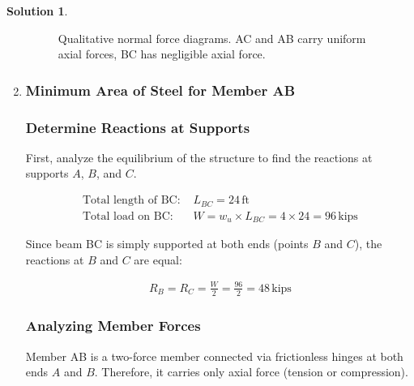 \documentclass[12pt]{article}
\theoremstyle{definition} %
\newtheorem{solution}{Solution}
\theoremstyle{plain} %
\begin{document}
\begin{solution}
\begin{enumerate}
\begin{figure}[h!]
        \caption{Qualitative normal force diagrams. AC and AB carry uniform axial forces, BC has negligible axial force.}
        \end{figure}
        
        
 
        
\hrulefill
\item \subsubsection*{Minimum Area of Steel for Member AB}

\subsubsection*{Determine Reactions at Supports}

First, analyze the equilibrium of the structure to find the reactions at supports \( A \), \( B \), and \( C \).


\begin{align}
\text{Total length of BC: } & L_{BC} = 24 \, \text{ft} \\
\text{Total load on BC: } & W = w_u \times L_{BC} = 4 \times 24 = 96 \, \text{kips}
\end{align}


Since beam BC is simply supported at both ends (points \( B \) and \( C \)), the reactions at \( B \) and \( C \) are equal:


\begin{align}
R_B = R_C = \frac{W}{2} = \frac{96}{2} = 48 \, \text{kips} \tag{1}
\end{align}


\subsubsection*{Analyzing Member Forces}

Member AB is a two-force member connected via frictionless hinges at both ends \( A \) and \( B \). Therefore, it carries only axial force (tension or compression).


\end{enumerate}
\end{solution}
\end{document}
